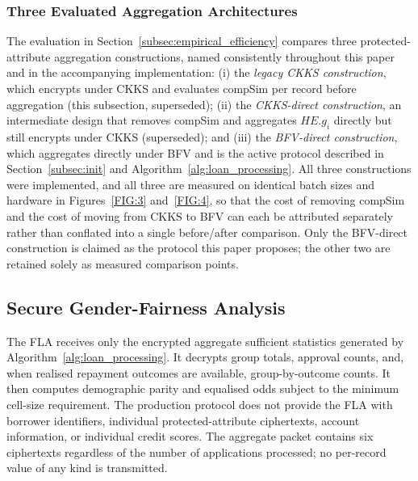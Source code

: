 \documentclass[a4paper,fleqn]{cas-dc}
\begin{document}
\subsubsection{Three Evaluated Aggregation Architectures} \label{subsec:evaluation_scheme_comparison} The evaluation in Section~\ref{subsec:empirical_efficiency} compares three protected-attribute aggregation constructions, named consistently throughout this paper and in the accompanying implementation: (i) the \emph{legacy CKKS construction}, which encrypts under CKKS and evaluates \textsf{compSim} per record before aggregation (this subsection, superseded); (ii) the \emph{CKKS-direct construction}, an intermediate design that removes \textsf{compSim} and aggregates $HE.g_i$ directly but still encrypts under CKKS (superseded); and (iii) the \emph{BFV-direct construction}, which aggregates directly under BFV and is the active protocol described in Section~\ref{subsec:init} and Algorithm~\ref{alg:loan_processing}. All three constructions were implemented, and all three are measured on identical batch sizes and hardware in Figures~\ref{FIG:3} and~\ref{FIG:4}, so that the cost of removing \textsf{compSim} and the cost of moving from CKKS to BFV can each be attributed separately rather than conflated into a single before/after comparison. Only the BFV-direct construction is claimed as the protocol this paper proposes; the other two are retained solely as measured comparison points.

\subsection{Secure Gender-Fairness Analysis}

The FLA receives only the encrypted aggregate sufficient statistics generated
by Algorithm~\ref{alg:loan_processing}. It decrypts group totals, approval
counts, and, when realised repayment outcomes are available, group-by-outcome
counts. It then computes demographic parity and equalised odds subject to the
minimum cell-size requirement. The production protocol does not provide the
FLA with borrower identifiers, individual protected-attribute ciphertexts,
account information, or individual credit scores. The aggregate packet
contains six ciphertexts regardless of the number of applications processed;
no per-record value of any kind is transmitted.
\end{document}
